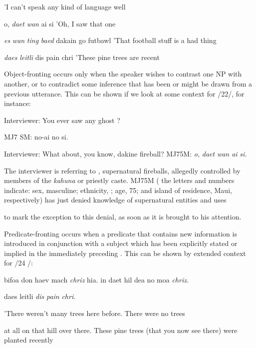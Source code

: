 'I can't speak any kind of language well

\ea\label{ex:22}
 o, \textit{daet} \textit{wan} ai si 'Oh, I saw that one
\glt
\z

\ea\label{ex:23}
 \textit{es} \textit{wan} \textit{ting} \textit{baed} dakain go futbawl 'That football stuff is a had thing
\glt
\z

\ea\label{ex:24}
 \textit{daes} \textit{leitli} dis pain chri 'These pine trees are recent
\glt
\z

Object-fronting occurs only when the speaker wishes to contrast one NP with another, or to contradict some inference that has been or might be drawn from a previous utterance. This can be shown if we look at some context for /22/, for instance:

\ea\label{ex:25}
 Interviewer: You ever saw any ghost ?
\glt
\z

MJ7 SM: no-ai no si.

Interviewer: What about, you know, dakine fireball? MJ75M: \textit{o,} \textit{daet} \textit{wan ai} \textit{si.}

The interviewer is referring to \textit{,} supernatural fireballs, allegedly controlled by members of the \textit{kahuna} or  priestly caste. MJ75M ( the letters and numbers indicate: sex, masculine; ethnicity, ; age, 75; and island of residence, Maui, respectively) has just denied knowledge of supernatural entities and uses 

to mark the exception to this denial, as soon as it is brought to his attention.

Predicate-fronting occurs when a predicate that contains new information is introduced in conjunction with a subject which has been explicitly stated or implied in the immediately preceding . This can be shown by extended context for /24 /:

\ea\label{ex:26}
 bifoa don haev mach \textit{chriz} hia. in daet hil dea no moa \textit{chriz.}
\glt
\z

daes leitli \textit{dis} \textit{pain} \textit{chri.}

'There weren't many trees here before. There were no trees

  


 


at all on that hill over there. These pine trees (that you now see there) were planted recently

